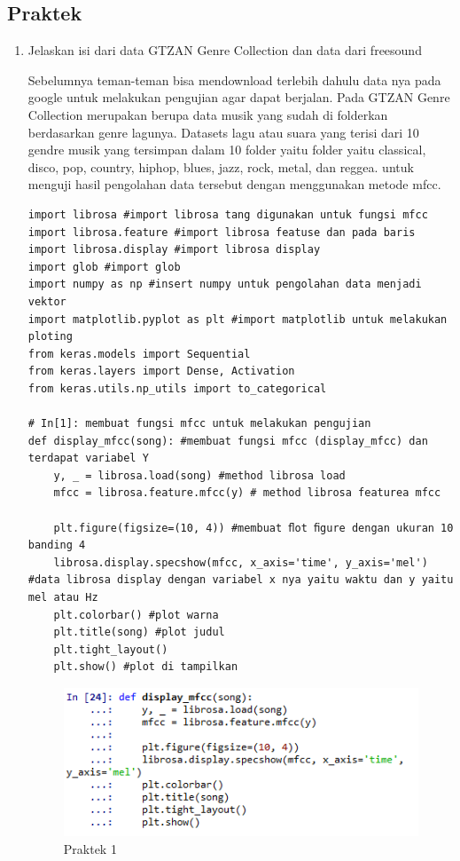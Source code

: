 \subsection{Praktek}
\begin{enumerate}

\item Jelaskan isi dari data GTZAN Genre Collection dan data dari freesound

\par Sebelumnya teman-teman bisa mendownload terlebih dahulu data nya pada google untuk melakukan pengujian agar dapat berjalan. Pada GTZAN Genre Collection merupakan berupa data musik yang sudah di folderkan berdasarkan genre lagunya. Datasets lagu atau suara yang terisi dari 10 gendre musik yang tersimpan dalam 10 folder yaitu folder yaitu classical, disco, pop, country, hiphop, blues, jazz, rock, metal, dan reggea. untuk menguji hasil pengolahan data tersebut dengan menggunakan metode mfcc.
\begin{verbatim}
import librosa #import librosa tang digunakan untuk fungsi mfcc
import librosa.feature #import librosa featuse dan pada baris
import librosa.display #import librosa display
import glob #import glob 
import numpy as np #insert numpy untuk pengolahan data menjadi vektor
import matplotlib.pyplot as plt #import matplotlib untuk melakukan ploting
from keras.models import Sequential 
from keras.layers import Dense, Activation
from keras.utils.np_utils import to_categorical

# In[1]: membuat fungsi mfcc untuk melakukan pengujian
def display_mfcc(song): #membuat fungsi mfcc (display_mfcc) dan terdapat variabel Y
    y, _ = librosa.load(song) #method librosa load 
    mfcc = librosa.feature.mfcc(y) # method librosa featurea mfcc

    plt.figure(figsize=(10, 4)) #membuat ﬂot ﬁgure dengan ukuran 10 banding 4
    librosa.display.specshow(mfcc, x_axis='time', y_axis='mel') #data librosa display dengan variabel x nya yaitu waktu dan y yaitu mel atau Hz
    plt.colorbar() #plot warna 
    plt.title(song) #plot judul 
    plt.tight_layout()
    plt.show() #plot di tampilkan
\end{verbatim}
\begin{figure}[H]
\centering
\includegraphics[scale=0.5]{figures/1174057/chapter6/p1.PNG}
\caption{Praktek 1}
\label{Praktek 1}
\end{figure}


\end{enumerate}
